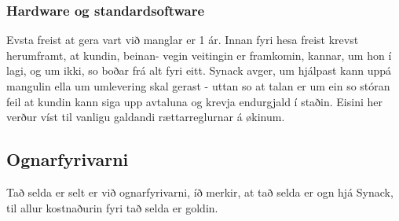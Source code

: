 \subsubsection*{Hardware og standardsoftware}
Evsta freist at gera vart við manglar er 1 ár. Innan fyri hesa freist krevst herumframt, at kundin, beinan- vegin veitingin er framkomin, kannar, um hon í lagi, og um ikki, so boðar frá alt fyri eitt. Synack avger, um hjálpast kann uppá mangulin ella um umlevering skal gerast - uttan so at talan er um ein so stóran feil at kundin kann siga upp avtaluna og krevja endurgjald í staðin. Eisini her verður víst til vanligu galdandi rættarreglurnar á økinum.

\subsection{Ognarfyrivarni}
Tað selda er selt er við ognarfyrivarni, íð merkir, at tað selda er ogn hjá Synack, til allur kostnaðurin fyri tað selda er goldin.


